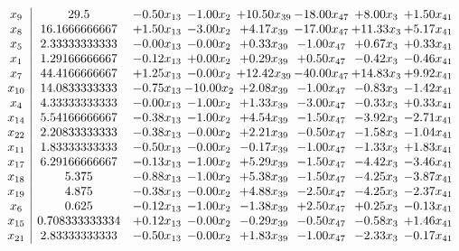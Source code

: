 \documentclass[8pt]{article}
\begin{document}
\[\begin{array}{c| c c@{\hskip 2pt} c@{\hskip 2pt} c@{\hskip 2pt} c@{\hskip 2pt} c@{\hskip 2pt} c@{\hskip 2pt} }
 x_{9}   &  29.5 & -0.50 x_{13} & -1.00 x_{2} & + 10.50 x_{39} & -18.00 x_{47} & +  8.00 x_{3} & +  1.50 x_{41}\\
 x_{8}   &  16.1666666667 & +  1.50 x_{13} & -3.00 x_{2} & +  4.17 x_{39} & -17.00 x_{47} & + 11.33 x_{3} & +  5.17 x_{41}\\
 x_{5}   &  2.33333333333 & -0.00 x_{13} & -0.00 x_{2} & +  0.33 x_{39} & -1.00 x_{47} & +  0.67 x_{3} & +  0.33 x_{41}\\
 x_{1}   &  1.29166666667 & -0.12 x_{13} & +  0.00 x_{2} & +  0.29 x_{39} & +  0.50 x_{47} & -0.42 x_{3} & -0.46 x_{41}\\
 x_{7}   &  44.4166666667 & +  1.25 x_{13} & -0.00 x_{2} & + 12.42 x_{39} & -40.00 x_{47} & + 14.83 x_{3} & +  9.92 x_{41}\\
 x_{10}   &  14.0833333333 & -0.75 x_{13} & -10.00 x_{2} & +  2.08 x_{39} & -1.00 x_{47} & -0.83 x_{3} & -1.42 x_{41}\\
 x_{4}   &  4.33333333333 & -0.00 x_{13} & -1.00 x_{2} & +  1.33 x_{39} & -3.00 x_{47} & -0.33 x_{3} & +  0.33 x_{41}\\
 x_{14}   &  5.54166666667 & -0.38 x_{13} & -1.00 x_{2} & +  4.54 x_{39} & -1.50 x_{47} & -3.92 x_{3} & -2.71 x_{41}\\
 x_{22}   &  2.20833333333 & -0.38 x_{13} & -0.00 x_{2} & +  2.21 x_{39} & -0.50 x_{47} & -1.58 x_{3} & -1.04 x_{41}\\
 x_{11}   &  1.83333333333 & -0.50 x_{13} & -0.00 x_{2} & -0.17 x_{39} & -1.00 x_{47} & -1.33 x_{3} & +  1.83 x_{41}\\
 x_{17}   &  6.29166666667 & -0.13 x_{13} & -1.00 x_{2} & +  5.29 x_{39} & -1.50 x_{47} & -4.42 x_{3} & -3.46 x_{41}\\
 x_{18}   &  5.375 & -0.88 x_{13} & -1.00 x_{2} & +  5.38 x_{39} & -1.50 x_{47} & -4.25 x_{3} & -3.87 x_{41}\\
 x_{19}   &  4.875 & -0.38 x_{13} & -0.00 x_{2} & +  4.88 x_{39} & -2.50 x_{47} & -4.25 x_{3} & -2.37 x_{41}\\
 x_{6}   &  0.625 & -0.12 x_{13} & -1.00 x_{2} & -1.38 x_{39} & +  2.50 x_{47} & +  0.25 x_{3} & -0.13 x_{41}\\
 x_{15}   &  0.708333333334 & +  0.12 x_{13} & -0.00 x_{2} & -0.29 x_{39} & -0.50 x_{47} & -0.58 x_{3} & +  1.46 x_{41}\\
 x_{21}   &  2.83333333333 & -0.50 x_{13} & -0.00 x_{2} & +  1.83 x_{39} & -1.00 x_{47} & -2.33 x_{3} & -0.17 x_{41}\\

\end{array}\]
\end{document}
